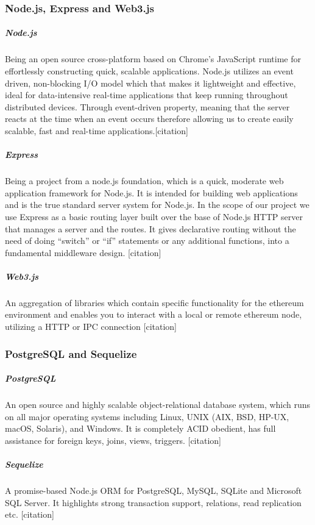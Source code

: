 \subsubsection{Node.js, Express and Web3.js}

\subparagraph{Node.js}
Being an open source cross-platform based on Chrome's JavaScript runtime for effortlessly constructing quick, scalable applications. Node.js utilizes an event driven, non-blocking I/O model which that makes it lightweight and effective, ideal for data-intensive real-time applications that keep running throughout distributed devices. Through event-driven property, meaning that the server reacts at the time when an event occurs therefore allowing us to create easily scalable, fast and real-time applications.[citation]

\subparagraph{Express}

Being a project from a node.js foundation, which is a quick, moderate web application framework for Node.js. It is intended for building web applications and is the true standard server system for Node.js. In the scope of our project we use Express as a basic routing layer built over the base of Node.js HTTP server that manages a server and the routes. It gives declarative routing without the need of doing “switch” or “if” statements or any additional functions, into a fundamental middleware design. [citation]

\subparagraph{Web3.js}
An aggregation of libraries which contain specific functionality for the ethereum environment and enables you to interact with a local or remote ethereum node, utilizing a HTTP or IPC connection [citation]



\subsubsection{PostgreSQL and Sequelize}
\subparagraph{PostgreSQL}
An open source and highly scalable object-relational database system, which runs on all major operating systems including Linux, UNIX (AIX, BSD, HP-UX, macOS, Solaris), and Windows. It is completely ACID obedient, has full assistance for foreign keys, joins, views, triggers. [citation]

\subparagraph{Sequelize}
A promise-based Node.js ORM for PostgreSQL, MySQL, SQLite and Microsoft SQL Server. It highlights strong transaction support, relations, read replication etc. [citation]


